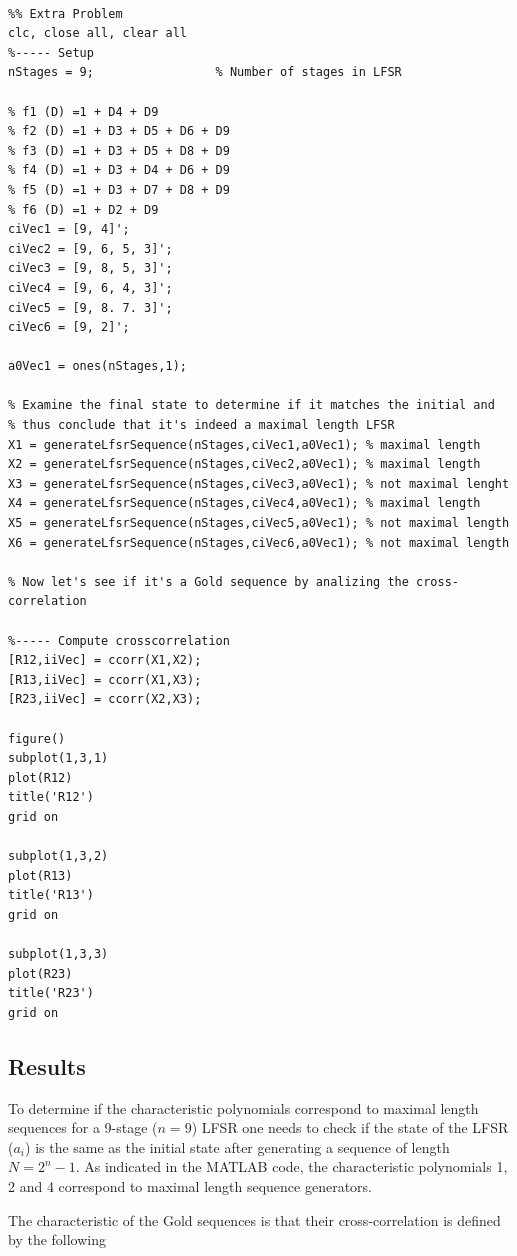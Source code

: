 \begin{lstlisting}

%% Extra Problem
clc, close all, clear all
%----- Setup
nStages = 9;                 % Number of stages in LFSR

% f1 (D) =1 + D4 + D9
% f2 (D) =1 + D3 + D5 + D6 + D9
% f3 (D) =1 + D3 + D5 + D8 + D9
% f4 (D) =1 + D3 + D4 + D6 + D9
% f5 (D) =1 + D3 + D7 + D8 + D9
% f6 (D) =1 + D2 + D9
ciVec1 = [9, 4]';  
ciVec2 = [9, 6, 5, 3]';
ciVec3 = [9, 8, 5, 3]';
ciVec4 = [9, 6, 4, 3]';
ciVec5 = [9, 8. 7. 3]';
ciVec6 = [9, 2]';

a0Vec1 = ones(nStages,1);

% Examine the final state to determine if it matches the initial and 
% thus conclude that it's indeed a maximal length LFSR
X1 = generateLfsrSequence(nStages,ciVec1,a0Vec1); % maximal length
X2 = generateLfsrSequence(nStages,ciVec2,a0Vec1); % maximal length
X3 = generateLfsrSequence(nStages,ciVec3,a0Vec1); % not maximal lenght
X4 = generateLfsrSequence(nStages,ciVec4,a0Vec1); % maximal length
X5 = generateLfsrSequence(nStages,ciVec5,a0Vec1); % not maximal length
X6 = generateLfsrSequence(nStages,ciVec6,a0Vec1); % not maximal length

% Now let's see if it's a Gold sequence by analizing the cross-correlation

%----- Compute crosscorrelation 
[R12,iiVec] = ccorr(X1,X2);
[R13,iiVec] = ccorr(X1,X3);
[R23,iiVec] = ccorr(X2,X3);

figure()
subplot(1,3,1)
plot(R12)
title('R12')
grid on

subplot(1,3,2)
plot(R13)
title('R13')
grid on

subplot(1,3,3)
plot(R23)
title('R23')
grid on
\end{lstlisting}

\subsection{Results}

To determine if the characteristic polynomials correspond to maximal length
sequences for a 9-stage ($n=9$) LFSR one needs to check if the state of the LFSR
($a_i$) is the same as the initial state after generating a sequence of
length $N=2^n -1$. As indicated in the MATLAB code, the characteristic polynomials
1, 2 and 4 correspond to maximal length sequence generators.

The characteristic of the Gold sequences is that their cross-correlation is
defined by the following

